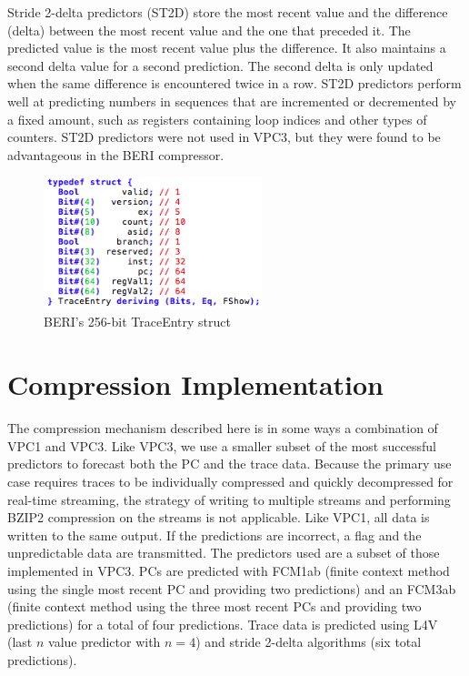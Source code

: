\documentclass[conference]{IEEEtran}
\begin{document}
Stride 2-delta predictors (ST2D) \cite{gabbay1996} store the most recent value and the difference (delta) between the most recent value and the one that preceded it. The predicted value is the most recent value plus the difference. It also maintains a second delta value for a second prediction. The second delta is only updated when the same difference is encountered twice in a row. ST2D predictors perform well at predicting numbers in sequences that are incremented or decremented by a fixed amount, such as registers containing loop indices and other types of counters. ST2D predictors were not used in VPC3, but they were found to be advantageous in the BERI compressor. 
\begin{figure}[!b]
\centering
\includegraphics[width=2.5in]{images/trace_types.png}
\caption{BERI's 256-bit TraceEntry struct}
\label{trace_types}
\end{figure}


\section{Compression Implementation}
The compression mechanism described here is in some ways a combination of VPC1 and VPC3. Like VPC3, we use a smaller subset of the most successful predictors to forecast both the PC and the trace data. Because the primary use case requires traces to be individually compressed and quickly decompressed for real-time streaming, the strategy of writing to multiple streams and performing BZIP2 compression on the streams is not applicable. Like VPC1, all data is written to the same output. If the predictions are incorrect, a flag and the unpredictable data are transmitted. The predictors used are a subset of those implemented in VPC3. PCs are predicted with FCM1ab (finite context method using the single most recent PC and providing two predictions) and an FCM3ab (finite context method using the three most recent PCs and providing two predictions) for a total of four predictions. Trace data is predicted using L4V (last $n$ value predictor with $n=4$) and stride 2-delta algorithms (six total predictions).  
\end{document}
